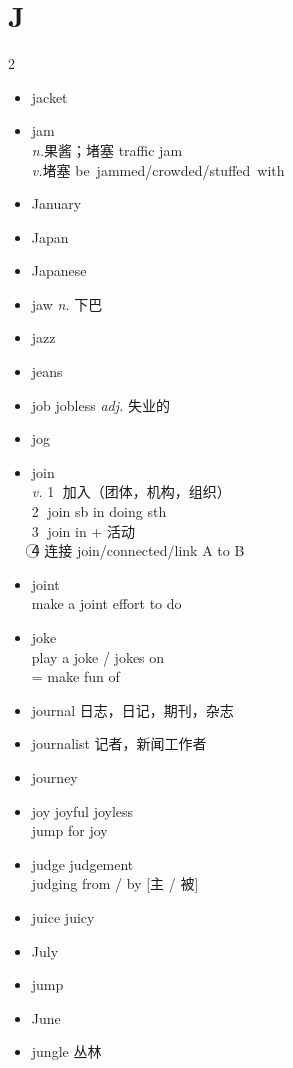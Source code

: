 \documentclass[../../book.tex]{subfiles}
\begin{document}
\section{J}
\raggedcolumns
\begin{multicols}{2}
\begin{itemize}
\item[-] jacket
\item[-] jam
\\\emph{n.}果酱；堵塞 traffic jam
\\\emph{v.}堵塞 \mbox{be jammed/crowded/stuffed with}
\item[-] January
\item[-] Japan
\item[-] Japanese
\item[-] jaw \emph{n.} 下巴
\item[-] jazz
\item[-] jeans
\item[-] job \phantom{a} jobless \emph{adj.} 失业的
\item[-] jog
\item[-] join
\\\emph{v.} \textcircled{1} 加入（团体，机构，组织）
\\ \textcircled{2} join sb in doing sth
\\ \textcircled{3} join in + 活动
\\ \textcircled{4} 连接 join/connected/link A to B
\item[-] joint
\\make a joint effort to do
\item[-] joke
\\play a joke / jokes on
\\= make fun of
\item[-] journal 日志，日记，期刊，杂志
\item[-] journalist 记者，新闻工作者
\item[-] journey
\item[-] joy \phantom{a} joyful joyless
\\jump for joy
\item[-] judge \phantom{a} judgement
\\judging from / by [主 / 被]
\item[-] juice \phantom{a} juicy
\item[-] July
\item[-] jump
\item[-] June
\item[-] jungle 丛林

\end{itemize}
\end{multicols}
\end{document}
